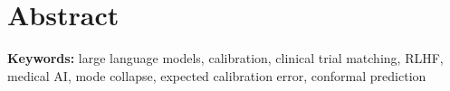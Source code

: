 
\chapter*{Abstract}







\vspace{0.5cm}
\noindent\textbf{Keywords:} large language models, calibration, clinical trial
matching, RLHF, medical AI, mode collapse, expected calibration error,
conformal prediction

\cleardoublepage
